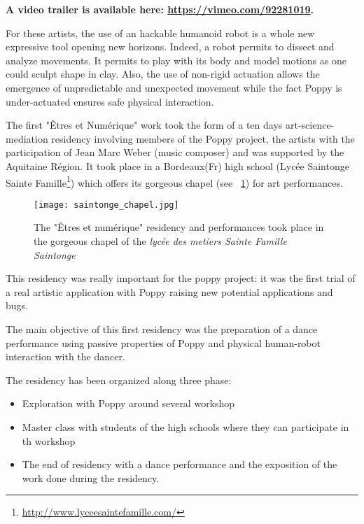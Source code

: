 \textbf{A video trailer is available here: \url{https://vimeo.com/92281019}.}

For these artists, the use of an hackable humanoid robot is a whole new expressive tool opening new horizons. Indeed, a robot permits to dissect and analyze movements. It permits to play with its body and model motions as one could sculpt shape in clay. Also, the use of non-rigid actuation allows the emergence of unpredictable and unexpected movement while the fact Poppy is under-actuated ensures safe physical interaction.


The first "Êtres et Numérique" work took the form of a ten days art-science-mediation residency involving members of the Poppy project, the artists with the participation of Jean Marc Weber (music composer) and was supported by the Aquitaine Région. It took place in a Bordeaux(Fr) high school (Lycée Saintonge Sainte Famille\footnote{\url{http://www.lyceesaintefamille.com/}}) which offers its gorgeous chapel (see \figurename~\ref{fig:saintonge_chapel}) for art performances.

\begin{figure}[t]
    \begin{center}
        \texttt{[image: saintonge\_chapel.jpg]}
    \end{center}
    \caption{The "Êtres et numérique" residency and performances took place in the gorgeous chapel of the \emph{lycée des metiers Sainte Famille Saintonge}}
    \label{fig:saintonge_chapel}
\end{figure}


This residency was really important for the poppy project: it was the first trial of a real artistic application with Poppy raising new potential applications and bugs.

The main objective of this first residency was the preparation of a dance performance using passive properties of Poppy and physical human-robot interaction with the dancer.


The residency has been organized along three phase:

\begin{itemize}
    \item Exploration with Poppy around several workshop
    \item Master class with students of the high schools where they can participate in th workshop
    \item The end of residency with a dance performance and the exposition of the work done during the residency.
\end{itemize}


